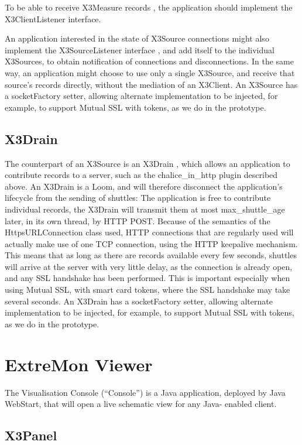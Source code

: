 To be able to receive X3Measure records , the application should implement
the X3ClientListener interface.

An application interested in the state of X3Source connections might
also implement the X3SourceListener interface , and add itself to
the individual X3Sources, to obtain notification of connections and
disconnections.  In the same way, an application might choose to use
only a single X3Source, and receive that source's records directly,
without the mediation of an X3Client. An X3Source has a socketFactory
setter, allowing alternate implementation to be injected, for example,
to support Mutual SSL with tokens, as we do in the prototype.

\subsection{X3Drain}

The counterpart of an X3Source is an X3Drain , which allows an
application to contribute records to a \diffproto{} server, such as
the chalice\_in\_http plugin described above. An X3Drain is a Loom, and
will therefore disconnect the application's lifecycle from the sending
of shuttles: The application is free to contribute individual records,
the X3Drain will transmit them at most max\_shuttle\_age later, in its own
thread, by HTTP POST. Because of the semantics of the HttpsURLConnection
class used, HTTP connections that are regularly used will actually make
use of one TCP connection, using the HTTP keepalive mechanism. This means
that as long as there are records available every few seconds, shuttles
will arrive at the server with very little delay, as the connection is
already open, and any SSL handshake has been performed. This is important
especially when using Mutual SSL, with smart card tokens, where the
SSL handshake may take several seconds. An X3Drain has a socketFactory
setter, allowing alternate implementation to be injected, for example,
to support Mutual SSL with tokens, as we do in the prototype.

\section{ExtreMon Viewer}

The Visualisation Console (``Console'') is a Java application, deployed
by Java WebStart, that will open a live schematic view for any Java-
enabled client.

\subsection{X3Panel}

